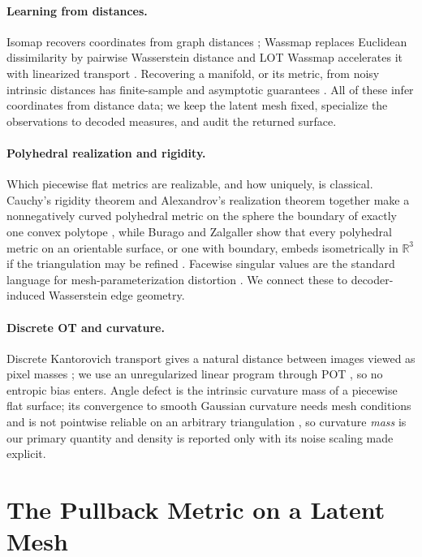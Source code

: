 \paragraph{Learning from distances.}
Isomap recovers coordinates from graph distances \cite{tenenbaum2000}; Wassmap
replaces Euclidean dissimilarity by pairwise Wasserstein distance
\cite{hamm2023wassmap} and LOT Wassmap accelerates it with linearized
transport \cite{cloninger2025}.  Recovering a manifold, or its metric, from
noisy intrinsic distances has finite-sample and asymptotic guarantees
\cite{qiu2023,fefferman2020,hamm2025}.  All of these infer coordinates from
distance data; we keep the latent mesh fixed, specialize the observations to
decoded measures, and audit the returned surface.

\paragraph{Polyhedral realization and rigidity.}
Which piecewise flat metrics are realizable, and how uniquely, is classical.
Cauchy's rigidity theorem and Alexandrov's realization theorem together make a
nonnegatively curved polyhedral metric on the sphere the boundary of exactly
one convex polytope \cite{alexandrov2005,pak2010}, while Burago and Zalgaller
show that every polyhedral metric on an orientable surface, or one with
boundary, embeds isometrically in $\mathbb R^3$ if the triangulation may be
refined \cite{burago1995}.  Facewise singular values are the standard language
for mesh-parameterization distortion \cite{lipman2012}.  We connect these to
decoder-induced Wasserstein edge geometry.

\paragraph{Discrete OT and curvature.}
Discrete Kantorovich transport gives a natural distance between images viewed
as pixel masses \cite{peyre2019}; we use an unregularized linear program
through POT \cite{flamary2021}, so no entropic bias enters.  Angle defect is
the intrinsic curvature mass of a piecewise flat surface; its convergence to
smooth Gaussian curvature needs mesh conditions and is not pointwise reliable
on an arbitrary triangulation \cite{gawlik2020,hartig2021}, so curvature
\emph{mass} is our primary quantity and density is reported only with its
noise scaling made explicit.

\section{The Pullback Metric on a Latent Mesh}
\label{sec:setup}

